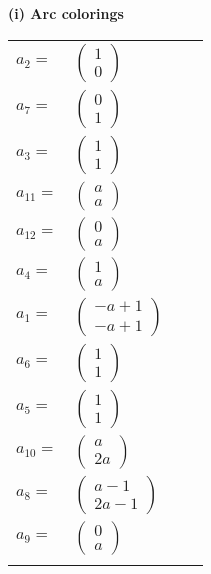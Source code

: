 \documentclass[1p]{elsarticle_modified}
\theoremstyle{definition}
\begin{document}
\flushleft \textbf{(i) Arc colorings}\\
\begin{tabular}{m{7pt} m{180pt} m{7pt} m{180pt} }
\flushright $a_{2}=$&$\begin{pmatrix}1\\0\end{pmatrix}$ \\
\flushright $a_{7}=$&$\begin{pmatrix}0\\1\end{pmatrix}$ \\
\flushright $a_{3}=$&$\begin{pmatrix}1\\1\end{pmatrix}$ \\
\flushright $a_{11}=$&$\begin{pmatrix}a\\a\end{pmatrix}$ \\
\flushright $a_{12}=$&$\begin{pmatrix}0\\a\end{pmatrix}$ \\
\flushright $a_{4}=$&$\begin{pmatrix}1\\a\end{pmatrix}$ \\
\flushright $a_{1}=$&$\begin{pmatrix}- a+1\\- a+1\end{pmatrix}$ \\
\flushright $a_{6}=$&$\begin{pmatrix}1\\1\end{pmatrix}$ \\
\flushright $a_{5}=$&$\begin{pmatrix}1\\1\end{pmatrix}$ \\
\flushright $a_{10}=$&$\begin{pmatrix}a\\2 a\end{pmatrix}$ \\
\flushright $a_{8}=$&$\begin{pmatrix}a-1\\2 a-1\end{pmatrix}$ \\
\flushright $a_{9}=$&$\begin{pmatrix}0\\a\end{pmatrix}$\\&\end{tabular}
\end{document}
